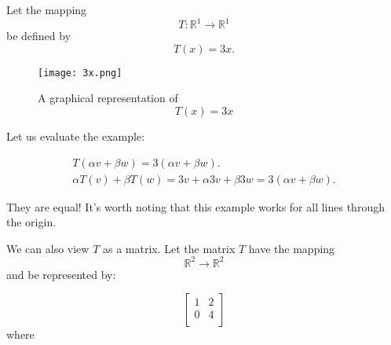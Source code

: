 \begin{exmp}
     Let the mapping $$T: \mathbb{R}^1 \rightarrow \mathbb{R}^1$$ be defined by \[ T(x)=3x. \]
\end{exmp}
\begin{figure}[h]
         \centering
         \texttt{[image: 3x.png]}
         \caption{\small{A graphical representation of $$T(x)= 3x$$}}
 \end{figure}
Let us evaluate the example: 

    \begin{align*}
    T(\alpha v + \beta w) = 3(\alpha v + \beta w).\\
    \alpha T(v) + \beta T(w) = 3v + \alpha 3v + \beta 3w = 3(\alpha v + \beta w).
    \end{align*} 

They are equal! It's worth noting that this example works for all lines through the origin. 
\begin{exmp}
We can also view $T$ as a matrix. Let the matrix $T$ have the mapping $$\mathbb{R}^2 \rightarrow \mathbb{R}^2$$ and be represented by:
\end{exmp}

$$
 \begin{bmatrix}
    
    1   &   2 \\
    0   &   4 \\
\end{bmatrix}
$$
where

